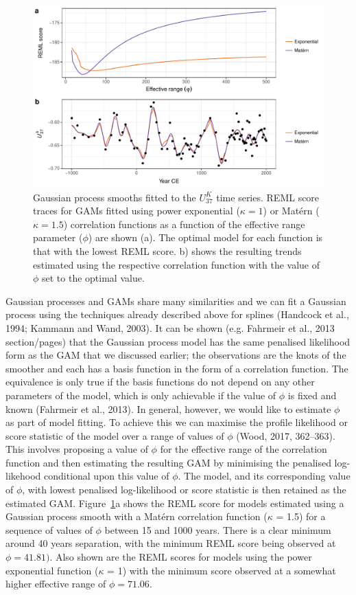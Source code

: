 \documentclass[12pt,]{article}
\newcommand{\uk}{\ensuremath{\mathit{U}^{\mathit{K}}_{\mathup{37}}}}
\begin{document}
\begin{figure}

{\centering \includegraphics[width=0.8\linewidth]{manuscript_files/figure-latex/gp-gam-detail-plot-1} 

}

\caption{Gaussian process smooths fitted to the \uk{} time series. REML score traces for GAMs fitted using power exponential ($\kappa = 1$) or Matérn ($\kappa = 1.5$) correlation functions as a function of the effective range parameter ($\phi$) are shown (a). The optimal model for each function is that with the lowest REML score. b) shows the resulting trends estimated using the respective correlation function with the value of $\phi$ set to the optimal value.}\label{fig:gp-gam-detail-plot}
\end{figure}

Gaussian processes and GAMs share many similarities and we can fit a
Gaussian process using the techniques already described above for
splines (Handcock et al., 1994; Kammann and Wand, 2003). It can be shown
(e.g. Fahrmeir et al., 2013 section/pages) that the Gaussian process
model has the same penalised likelihood form as the GAM that we
discussed earlier; the observations are the knots of the smoother and
each has a basis function in the form of a correlation function. The
equivalence is only true if the basis functions do not depend on any
other parameters of the model, which is only achievable if the value of
\(\phi\) is fixed and known (Fahrmeir et al., 2013). In general,
however, we would like to estimate \(\phi\) as part of model fitting. To
achieve this we can maximise the profile likelihood or score statistic
of the model over a range of values of \(\phi\) (Wood, 2017, 362--363).
This involves proposing a value of \(\phi\) for the effective range of
the correlation function and then estimating the resulting GAM by
minimising the penalised log-likehood conditional upon this value of
\(\phi\). The model, and its corresponding value of \(\phi\), with
lowest penalised log-likelihood or score statistic is then retained as
the estimated GAM. Figure~\ref{fig:gp-gam-detail-plot}a shows the REML
score for models estimated using a Gaussian process smooth with a Matérn
correlation function (\(\kappa\) = 1.5) for a sequence of values of
\(\phi\) between 15 and 1000 years. There is a clear minimum around 40
years separation, with the minimum REML score being observed at
\(\phi = 41.81)\). Also shown are the REML scores for models using the
power exponential function (\(\kappa\) = 1) with the minimum score
observed at a somewhat higher effective range of \(\phi = 71.06\).
\end{document}
